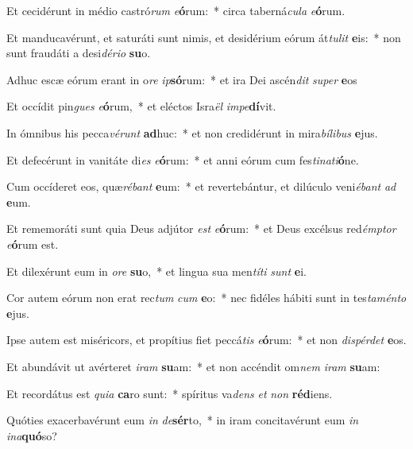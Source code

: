 \item Et cecidérunt in médio castró\textit{rum} \textit{e}\textbf{ó}rum:~* circa taberná\textit{cu}\textit{la} \textit{e}\textbf{ó}rum.
\item Et manducavérunt, et saturáti sunt nimis, et desidérium eórum át\textit{tu}\textit{lit} \textbf{e}is:~* non sunt fraudáti a desi\textit{dé}\textit{ri}\textit{o} \textbf{su}o.
\item Adhuc escæ eórum erant in o\textit{re} \textit{ip}\textbf{só}rum:~* et ira Dei ascén\textit{dit} \textit{su}\textit{per} \textbf{e}os
\item Et occídit pin\textit{gues} \textit{e}\textbf{ó}rum,~* et eléctos Isra\textit{ël} \textit{im}\textit{pe}\textbf{dí}vit.
\item In ómnibus his pecca\textit{vé}\textit{runt} \textbf{ad}huc:~* et non credidérunt in mira\textit{bí}\textit{li}\textit{bus} \textbf{e}jus.
\item Et defecérunt in vanitáte di\textit{es} \textit{e}\textbf{ó}rum:~* et anni eórum cum fes\textit{ti}\textit{na}\textit{ti}\textbf{ó}ne.
\item Cum occíderet eos, quæ\textit{ré}\textit{bant} \textbf{e}um:~* et revertebántur, et dilúculo veni\textit{é}\textit{bant} \textit{ad} \textbf{e}um.
\item Et rememoráti sunt quia Deus adjútor \textit{est} \textit{e}\textbf{ó}rum:~* et Deus excélsus red\textit{émp}\textit{tor} \textit{e}\textbf{ó}rum est.
\item Et dilexérunt eum in \textit{o}\textit{re} \textbf{su}o,~* et lingua sua men\textit{tí}\textit{ti} \textit{sunt} \textbf{e}i.
\item Cor autem eórum non erat rec\textit{tum} \textit{cum} \textbf{e}o:~* nec fidéles hábiti sunt in tes\textit{ta}\textit{mén}\textit{to} \textbf{e}jus.
\item Ipse autem est miséricors, et propítius fiet peccá\textit{tis} \textit{e}\textbf{ó}rum:~* et non \textit{dis}\textit{pér}\textit{det} \textbf{e}os.
\item Et abundávit ut avérteret \textit{i}\textit{ram} \textbf{su}am:~* et non accéndit om\textit{nem} \textit{i}\textit{ram} \textbf{su}am:
\item Et recordátus est \textit{qui}\textit{a} \textbf{ca}ro sunt:~* spíritus va\textit{dens} \textit{et} \textit{non} \textbf{réd}iens.
\item Quóties exacerbavérunt eum \textit{in} \textit{de}\textbf{sér}to,~* in iram concitavérunt eum \textit{in} \textit{in}\textit{a}\textbf{quó}so?
